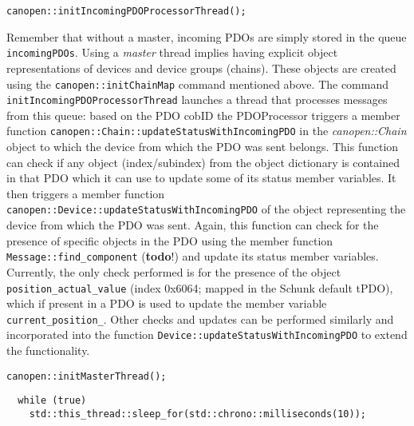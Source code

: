 \begin{verbatim}
canopen::initIncomingPDOProcessorThread();
\end{verbatim}
Remember that without a master, incoming PDOs are simply stored in the queue \texttt{incomingPDOs}. Using a {\em master} thread implies having explicit object representations of devices and device groups (chains). These objects are created using the \texttt{canopen::initChainMap} command mentioned above. The command \texttt{initIncomingPDOProcessorThread} launches a thread that processes messages from this queue: based on the PDO cobID the PDOProcessor triggers a member function \texttt{canopen::Chain::updateStatusWithIncomingPDO} in the {\em canopen::Chain} object to which the device from which the PDO was sent belongs. This function can check if any object (index/subindex) from the object dictionary is contained in that PDO which it can use to update some of its status member variables. It then triggers a member function \texttt{canopen::Device::updateStatusWithIncomingPDO} of the object representing the device from which the PDO was sent. Again, this function can check for the presence of specific objects in the PDO using the member function \texttt{Message::find\_component} ({\bf todo}!) and update its status member variables. Currently, the only check performed is for the presence of the object \texttt{position\_actual\_value} (index 0x6064; mapped in the Schunk default tPDO), which if present in a PDO is used to update the member variable \texttt{current\_position\_}. Other checks and updates can be performed similarly and incorporated into the function \texttt{Device::updateStatusWithIncomingPDO} to extend the functionality.

\begin{verbatim}
canopen::initMasterThread();
\end{verbatim}




\begin{verbatim}
  while (true)
    std::this_thread::sleep_for(std::chrono::milliseconds(10));
\end{verbatim}

    

 





